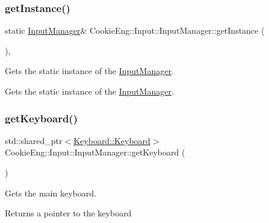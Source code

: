 \subsubsection{\texorpdfstring{get\+Instance()}{getInstance()}}
{\footnotesize\ttfamily static \hyperlink{class_cookie_eng_1_1_input_1_1_input_manager}{Input\+Manager}\& Cookie\+Eng\+::\+Input\+::\+Input\+Manager\+::get\+Instance (\begin{DoxyParamCaption}{ }\end{DoxyParamCaption})\hspace{0.3cm}{\ttfamily [inline]}, {\ttfamily [static]}}



Gets the static instance of the \hyperlink{class_cookie_eng_1_1_input_1_1_input_manager}{Input\+Manager}. 

Gets the static instance of the \hyperlink{class_cookie_eng_1_1_input_1_1_input_manager}{Input\+Manager}. \mbox{\label{class_cookie_eng_1_1_input_1_1_input_manager_afc8c29f4a07a98ea6599e5f421115361}} 
\subsubsection{\texorpdfstring{get\+Keyboard()}{getKeyboard()}}
{\footnotesize\ttfamily std\+::shared\+\_\+ptr$<$\hyperlink{class_cookie_eng_1_1_input_1_1_keyboard_1_1_keyboard}{Keyboard\+::\+Keyboard}$>$ Cookie\+Eng\+::\+Input\+::\+Input\+Manager\+::get\+Keyboard (\begin{DoxyParamCaption}{ }\end{DoxyParamCaption})\hspace{0.3cm}{\ttfamily [inline]}}



Gets the main keyboard. 

Returns a pointer to the keyboard \mbox{\label{class_cookie_eng_1_1_input_1_1_input_manager_ab76d5635bce758f681129ea0cd4afb36}} 
